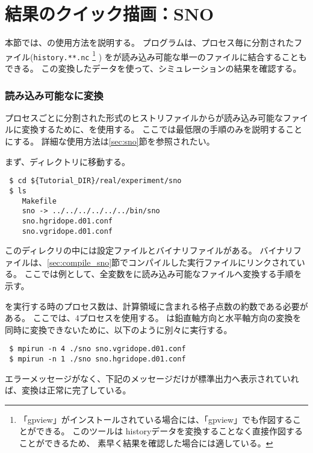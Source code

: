 \section{結果のクイック描画：SNO} \label{sec:quicklook}

本節では、\sno の使用方法を説明する。
プログラム\sno は、プロセス毎に分割された{\netcdf}ファイル(\verb|history.**.nc|
\footnote{「gpview」がインストールされている場合には、「gpview」でも作図することができる。
このツールは historyデータを変換することなく直接作図することができるため、
素早く結果を確認した場合には適している。
}
)
を{\grads}が読み込み可能な単一の{\netcdf}ファイルに結合することもできる。
この変換した{\netcdf}データを使って、シミュレーションの結果を確認する。


\subsubsection{{\grads}読み込み可能な{\netcdf}に変換}
プロセスごとに分割された{\netcdf}形式のヒストリファイルから{\grads}が読み込み可能な{\netcdf}ファイルに変換するために、\sno を使用する。
ここでは最低限の手順のみを説明することにする。
詳細な使用方法は\ref{sec:sno}節を参照されたい。

まず、\sno ディレクトリに移動する。
\begin{verbatim}
 $ cd ${Tutorial_DIR}/real/experiment/sno
 $ ls
    Makefile
    sno -> ../../../../../../bin/sno
    sno.hgridope.d01.conf
    sno.vgridope.d01.conf
\end{verbatim}
このディレクリの中には設定ファイルとバイナリファイルがある。
バイナリファイルは、\ref{sec:compile_sno}節でコンパイルした実行ファイルにリンクされている。
ここでは例として、全変数を{\grads}に読み込み可能な{\netcdf}ファイルへ変換する手順を示す。

\sno を実行する時のプロセス数は、計算領域に含まれる格子点数の約数である必要がある。
ここでは、4プロセスを使用する。
\sno は鉛直軸方向と水平軸方向の変換を同時に変換できないために、以下のように別々に実行する。
\begin{verbatim}
 $ mpirun -n 4 ./sno sno.vgridope.d01.conf
 $ mpirun -n 1 ./sno sno.hgridope.d01.conf
\end{verbatim}
エラーメッセージがなく、下記のメッセージだけが標準出力へ表示されていれば、変換は正常に完了している。

